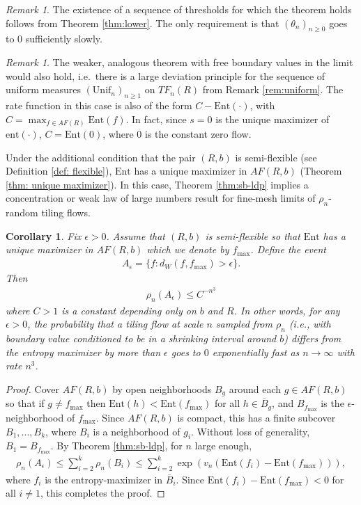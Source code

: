 \documentclass[11pt]{article}
\newtheorem{cor}[thm]{Corollary}
\theoremstyle{remark}
\newtheorem{rem}[thm]{Remark}
\theoremstyle{definition}
\newcommand{\ent}{\text{ent}}
\newcommand{\Ent}{\text{Ent}}
\begin{document}
\begin{rem}
The existence of a sequence of thresholds for which the theorem holds follows from Theorem \ref{thm:lower}. The only requirement is that $(\theta_n)_{n\geq 0}$ goes to $0$ sufficiently slowly.
\end{rem}

\begin{rem}
The weaker, analogous theorem with free boundary values in the limit would also hold, i.e.\ there is a large deviation principle for the sequence of uniform measures $(\text{Unif}_n)_{n\geq 1}$ on $TF_n(R)$ from Remark \ref{rem:uniform}. The rate function in this case is also of the form $C - \Ent(\cdot)$, with $C = \max_{f\in AF(R)} \Ent(f)$. In fact, since $s=0$ is the unique maximizer of $\ent(\cdot)$, $C = \Ent(0)$, where $0$ is the constant zero flow. 
\end{rem}


Under the additional condition that the pair $(R,b)$ is semi-flexible (see Definition \ref{def: flexible}), $\Ent$ has a unique maximizer in $AF(R,b)$ (Theorem \ref{thm: unique maximizer}). In this case, Theorem \ref{thm:sb-ldp} implies a concentration or weak law of large numbers result for fine-mesh limits of $\rho_n$-random tiling flows. 

\begin{cor}\label{cor:concentration}
Fix $\epsilon>0$. Assume that $(R,b)$ is semi-flexible so that $\Ent$ has a unique maximizer in $AF(R,b)$ which we denote by $f_{\max}$. Define the event
\begin{align*} 
A_{\epsilon} = \{f : d_W(f,f_{\max})>\epsilon\}.
\end{align*}
Then
\begin{align*}
    \rho_n(A_{\epsilon}) \leq C^{-n^3}
\end{align*}
where $C>1$ is a constant depending only on $b$ and $R$. In other words, for any $\epsilon>0$, the probability that a tiling flow at scale $n$ sampled from $\rho_n$ (i.e., with boundary value conditioned to be in a shrinking interval around $b$) differs from the entropy maximizer by more than $\epsilon$ goes to $0$ exponentially fast as $n\to \infty$ with rate $n^3$. 
\end{cor}
\begin{proof}
    Cover $AF(R,b)$ by open neighborhoods $B_g$ around each $g\in AF(R,b)$ so that if $g\neq f_{\max}$ then $\Ent(h)<\Ent(f_{\max})$ for all $h\in \overline{B}_g$, and $B_{f_{\max}}$ is the $\epsilon$-neighborhood of $f_{\max}$. Since $AF(R,b)$ is compact, this has a finite subcover $B_{1},...,B_{k}$, where $B_i$ is a neighborhood of $g_i$. Without loss of generality, $B_1 = B_{f_{\max}}$. By Theorem \ref{thm:sb-ldp}, for $n$ large enough,
    \begin{align*}
        \rho_n(A_{\epsilon}) \leq \sum_{i=2}^k \rho_n(B_{i}) \leq \sum_{i=2}^k \exp(v_n (\Ent(f_i)-\Ent(f_{\max}))),
    \end{align*}
    where $f_i$ is the entropy-maximizer in $\overline{B}_i$. Since $\Ent(f_i) - \Ent(f_{\max}) < 0$ for all $i\neq 1$, this completes the proof.
\end{proof}
\end{document}
